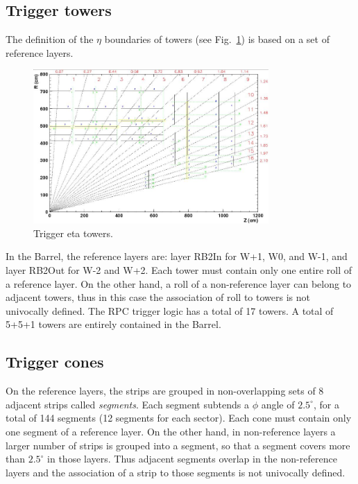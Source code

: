 \subsection{Trigger towers}
\label{sec:trig_towers}
The definition of the $\eta$ boundaries 
of towers (see Fig.~\ref{fig:eta_towers}) is based on a set 
of reference layers.

\begin{figure}[hbtp]
  \begin{center}
    \includegraphics[width=0.8\textwidth]{eta_towers}
    \hspace{1cm}
    \caption{Trigger eta towers.}
    \label{fig:eta_towers}
  \end{center}
\end{figure}

In the Barrel, the reference layers are:
layer RB2In for W+1, W0, and W-1, 
and layer RB2Out for W-2 and W+2. 
Each tower must contain only one entire roll 
of a reference layer. On the 
other hand, a roll of a non-reference layer
can belong to adjacent towers, thus in this case 
the association of roll to towers is not univocally defined. 
The RPC trigger logic has a total of 17 towers.
A total of 5+5+1 towers are entirely contained in the Barrel.

\subsection{Trigger cones}
On the reference layers, the strips are grouped in
non-overlapping sets of 8 adjacent strips called {\em segments}.
Each segment subtends a $\phi$ angle of $2.5^\circ$, for a total 
of 144 segments (12 segments for each sector).
Each cone must contain only one segment of a reference 
layer.
On the other hand, in non-reference layers a larger number
of strips is grouped into a segment, so that a segment
covers more than $2.5^\circ$ in those layers.
Thus adjacent segments overlap in the non-reference layers and 
the association of a strip to those segments is not univocally defined.

